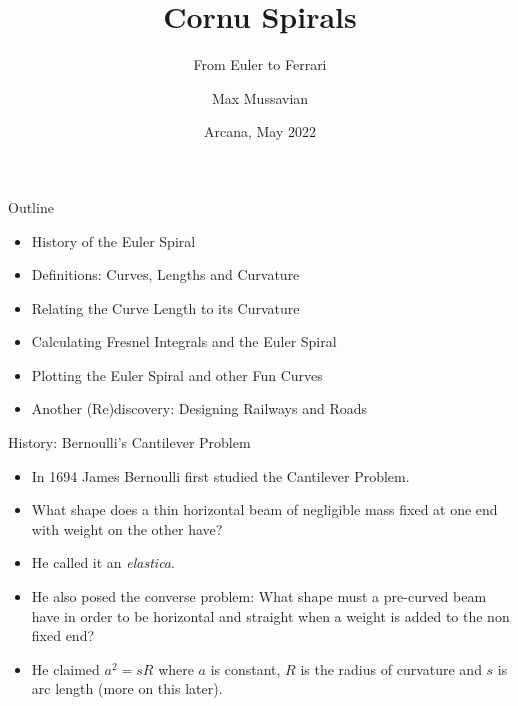 \documentclass{beamer}
\title{Cornu Spirals}
\subtitle{From Euler to Ferrari}
\author{Max Mussavian}
\date[2022]{Arcana, May 2022}
\begin{document}
\begin{frame}[plain]
    \maketitle
\end{frame}
\begin{frame}{Outline}
	\begin{itemize}
		\item History of the Euler Spiral
		\item Definitions: Curves, Lengths and Curvature
		\item Relating the Curve Length to its Curvature
		\item Calculating Fresnel Integrals and the Euler Spiral
		\item Plotting the Euler Spiral and other Fun Curves
		\item Another (Re)discovery: Designing Railways and Roads
	\end{itemize}
\end{frame}

\begin{frame}{History: Bernoulli's Cantilever Problem}
	\begin{itemize}
	\item In 1694 James Bernoulli first studied the Cantilever Problem.
	\item What shape does a thin horizontal beam of negligible mass fixed at one end with weight on the other have?
	\item He called it an \emph{elastica}.
	\item He also posed the converse problem: What shape must a pre-curved beam have in order to be horizontal and straight when a weight is added to the non fixed end?
	\item He claimed $a^2=s R$ where $a$ is constant, $R$ is the radius of curvature and $s$ is arc length (more on this later).
	\end{itemize}
\end{frame}
\end{document}
